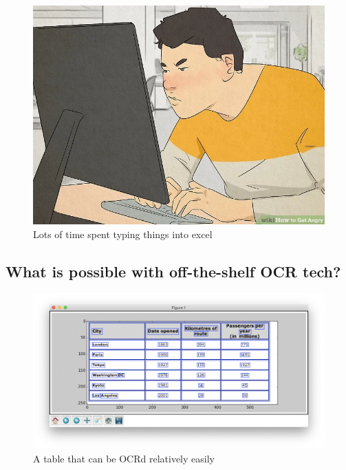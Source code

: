 \documentclass[
  letterpaper,
  DIV=11,
  numbers=noendperiod]{scrartcl}
\begin{document}
\begin{figure}

{\centering \includegraphics{assets/wikihow.jpeg}

}

\caption{Lots of time spent typing things into excel}

\end{figure}

\hypertarget{what-is-possible-with-off-the-shelf-ocr-tech}{%
\subsection{What is possible with off-the-shelf OCR
tech?}\label{what-is-possible-with-off-the-shelf-ocr-tech}}

\begin{figure}

{\centering \includegraphics{assets/ocr_good.png}

}

\caption{A table that can be OCRd relatively easily}

\end{figure}
\end{document}
